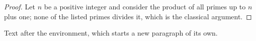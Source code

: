 \documentclass{article}
\begin{document}
\begin{proof}
Let $n$ be a positive integer and consider the product of all primes up to $n$ plus one; none of the listed primes divides it, which is the classical argument.
\end{proof}
Text after the environment, which starts a new paragraph of its own.
\end{document}
